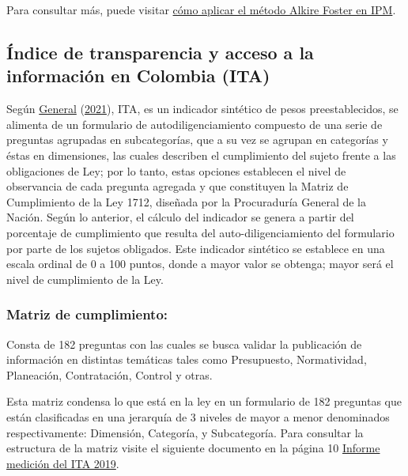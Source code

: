 \documentclass[
  11pt,
]{book}
\begin{document}
Para consultar más, puede visitar \href{https://mppn.org/es/pobreza-multidimensional/como-se-calcula/}{cómo aplicar el método Alkire Foster en IPM}.

\hypertarget{uxedndice-de-transparencia-y-acceso-a-la-informaciuxf3n-en-colombia-ita}{%
\subsection{Índice de transparencia y acceso a la información en Colombia (ITA)}\label{uxedndice-de-transparencia-y-acceso-a-la-informaciuxf3n-en-colombia-ita}}

Según \protect\hyperlink{ref-Pgn2021Sep}{General} (\protect\hyperlink{ref-Pgn2021Sep}{2021}), ITA, es un indicador sintético de pesos preestablecidos, se alimenta de un formulario de autodiligenciamiento compuesto de una serie de preguntas agrupadas en subcategorías, que a su vez se agrupan en categorías y éstas en dimensiones, las cuales describen el cumplimiento del sujeto
frente a las obligaciones de Ley; por lo tanto, estas opciones establecen el nivel de observancia
de cada pregunta agregada y que constituyen la Matriz de Cumplimiento de la Ley 1712, diseñada
por la Procuraduría General de la Nación. Según lo anterior, el cálculo del indicador se genera a
partir del porcentaje de cumplimiento que resulta del auto-diligenciamiento del formulario por
parte de los sujetos obligados. Este indicador sintético se establece en una escala ordinal de 0 a
100 puntos, donde a mayor valor se obtenga; mayor será el nivel de cumplimiento de la Ley.

\hypertarget{matriz-de-cumplimiento}{%
\subsubsection{Matriz de cumplimiento:}\label{matriz-de-cumplimiento}}

Consta de 182 preguntas con las cuales se busca validar la publicación de información en distintas temáticas tales como Presupuesto, Normatividad, Planeación, Contratación, Control y otras.

Esta matriz condensa lo que está en la ley en un formulario de 182 preguntas que están clasificadas en una jerarquía de 3 niveles de mayor a menor denominados respectivamente: Dimensión, Categoría, y Subcategoría. Para consultar la estructura de la matriz visite el siguiente documento en la página 10 \href{https://www.procuraduria.gov.co/portal/media/file/Resultados\%20Medicion\%20ITA\%202019.pdf}{Informe medición del ITA 2019}.
\end{document}
